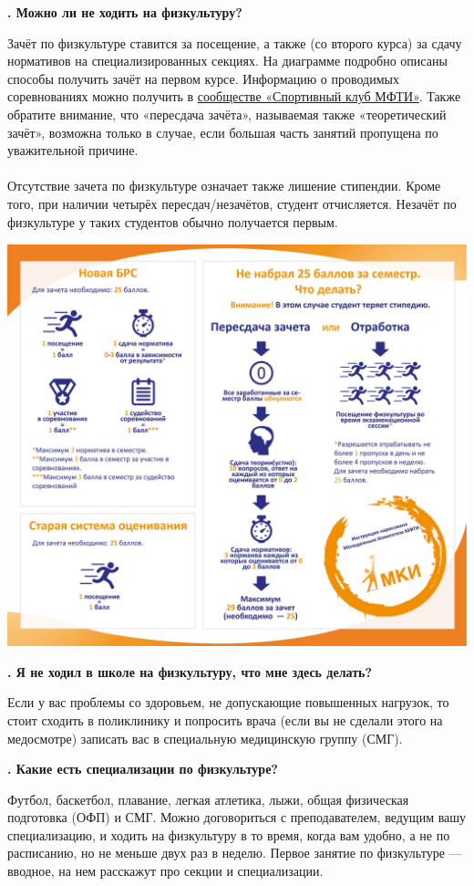 \documentclass[14pt]{extarticle}
\newcounter{question}
\newcommand\Que[1]{%
    \begin{minipage}{\textwidth}
    \leavevmode\par
    \stepcounter{question}
    \noindent
    {\large\textbf{\thequestion. #1}}\par}
\newcommand\Ans[2][]{%
    \leavevmode\par\noindent
    {\leftskip37pt
    \textbf{#1}#2\par}
    \end{minipage}}
\newcommand\Partans[2][]{%
    \leavevmode\par\noindent
    {\leftskip37pt
    \textbf{#1}#2\par}}
\begin{document}
\Que{Можно ли не ходить на физкультуру?}
\Partans{Зачёт по физкультуре ставится за посещение, а также (со второго курса) за сдачу нормативов на специализированных секциях. На диаграмме подробно описаны способы получить зачёт на первом курсе. Информацию о проводимых соревнованиях можно получить в \href{https://vk.com/miptsport}{сообществе «Спортивный клуб МФТИ»}. Также обратите внимание, что «пересдача зачёта», называемая также «теоретический зачёт», возможна только в случае, если большая часть занятий пропущена по уважительной причине. \\ \\  Отсутствие зачета по физкультуре означает также лишение стипендии. Кроме того, при наличии четырёх пересдач/незачётов, студент отчисляется. Незачёт по физкультуре у таких студентов обычно получается первым. }
\includegraphics[width = 150 mm]{resources/fizra.jpg}
\end{minipage}

\Que{Я не ходил в школе на физкультуру, что мне здесь делать?}
\Ans{Если у вас проблемы со здоровьем, не допускающие повышенных нагрузок, то стоит сходить в поликлинику и попросить врача (если вы не сделали этого на медосмотре) записать вас в специальную медицинскую группу (СМГ).}

\Que{Какие есть специализации по физкультуре?}
\Ans{Футбол, баскетбол, плавание, легкая атлетика, лыжи, общая физическая подготовка (ОФП) и СМГ. Можно договориться с преподавателем, ведущим вашу специализацию, и ходить на физкультуру в то время, когда вам удобно, а не по расписанию, но не меньше двух раз в неделю. Первое занятие по физкультуре — вводное, на нем расскажут про секции и специализации.}
\end{document}
